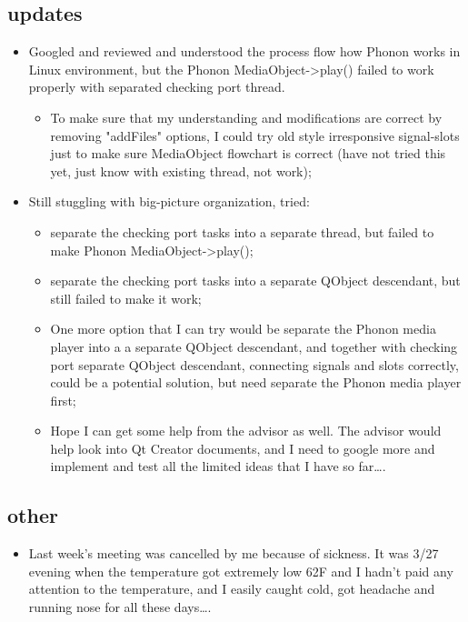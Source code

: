 \documentclass[9pt,b5paper]{article}
\begin{document}
\subsection{updates}
\label{sec-2-1}
\begin{itemize}
\item Googled and reviewed and understood the process flow how Phonon works in Linux environment, but the Phonon MediaObject->play() failed to work properly with separated checking port thread. 
\begin{itemize}
\item To make sure that my understanding and modifications are correct by removing "addFiles" options, I could try old style irresponsive signal-slots just to make sure MediaObject flowchart is correct (have not tried this yet, just know with existing thread, not work);
\end{itemize}
\item Still stuggling with big-picture organization, tried: 
\begin{itemize}
\item separate the checking port tasks into a separate thread, but failed to make Phonon MediaObject->play();
\item separate the checking port tasks into a separate QObject descendant, but still failed to make it work;
\item One more option that I can try would be separate the Phonon media player into a a separate QObject descendant, and together with checking port separate QObject descendant, connecting signals and slots correctly, could be a potential solution, but need separate the Phonon media player first;
\item Hope I can get some help from the advisor as well. The advisor would help look into Qt Creator documents, and I need to google more and implement and test all the limited ideas that I have so far\ldots{}.
\end{itemize}
\end{itemize}
\subsection{other}
\label{sec-1-2}
\begin{itemize}
\item Last week's meeting was cancelled by me because of sickness. It was 3/27 evening when the temperature got extremely low 62F and I hadn't paid any attention to the temperature, and I easily caught cold, got headache and running nose for all these days\ldots{}.
\end{itemize}
\end{document}
